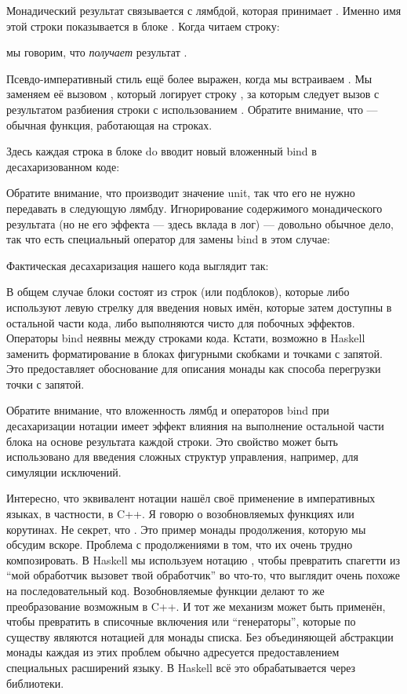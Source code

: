 Монадический результат  связывается с лямбдой, которая принимает
. Именно имя этой строки показывается в
блоке . Когда читаем строку:

мы говорим, что  \emph{получает} результат .

Псевдо-императивный стиль ещё более выражен, когда мы встраиваем
. Мы заменяем её вызовом , который
логирует строку , за которым следует вызов
 с результатом разбиения строки 
с использованием . Обратите внимание, что  --- обычная функция,
работающая на строках.

Здесь каждая строка в блоке do вводит новый вложенный bind в
десахаризованном коде:

Обратите внимание, что  производит значение unit, так что его не нужно
передавать в следующую лямбду. Игнорирование содержимого монадического
результата (но не его эффекта --- здесь вклада в лог) ---
довольно обычное дело, так что есть специальный оператор для замены bind в этом
случае:

Фактическая десахаризация нашего кода выглядит так:

В общем случае блоки  состоят из строк (или подблоков), которые
либо используют левую стрелку для введения новых имён, которые затем доступны
в остальной части кода, либо выполняются чисто для побочных эффектов. Операторы
bind неявны между строками кода. Кстати, возможно
в Haskell заменить форматирование в блоках 
фигурными скобками и точками с запятой. Это предоставляет обоснование для
описания монады как способа перегрузки точки с запятой.

Обратите внимание, что вложенность лямбд и операторов bind при десахаризации
нотации  имеет эффект влияния на выполнение
остальной части блока  на основе результата каждой строки. Это
свойство может быть использовано для введения сложных структур управления, например,
для симуляции исключений.

Интересно, что эквивалент нотации  нашёл своё
применение в императивных языках, в частности, в C++. Я говорю
о возобновляемых функциях или корутинах. Не секрет, что
. Это пример монады продолжения, которую мы
обсудим вскоре. Проблема с продолжениями в том, что их очень
трудно композировать. В Haskell мы используем нотацию , чтобы превратить
спагетти из ``мой обработчик вызовет твой обработчик'' во что-то, что
выглядит очень похоже на последовательный код. Возобновляемые функции делают то же
преобразование возможным в C++. И тот же механизм может быть применён, чтобы
превратить
 в списочные включения или ``генераторы'', которые по существу
являются нотацией  для монады списка. Без
объединяющей абстракции монады каждая из этих проблем обычно
адресуется предоставлением специальных расширений языку. В Haskell
всё это обрабатывается через библиотеки.
